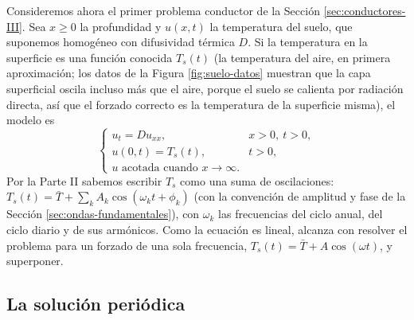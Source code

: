 \documentclass[12pt, a4paper]{amsbook}
\theoremstyle{remark}
\theoremstyle{definition}
\numberwithin{section}{chapter}
\numberwithin{subsection}{section}
\numberwithin{equation}{section}
\numberwithin{figure}{chapter}
\begin{document}
Consideremos ahora el primer problema conductor de la Sección \ref{sec:conductores-III}. Sea $x\ge 0$ la profundidad y $u(x,t)$ la temperatura del suelo, que suponemos homogéneo con difusividad térmica $D$. Si la temperatura en la superficie es una función conocida $T_s(t)$ (la temperatura del aire, en primera aproximación; los datos de la Figura \ref{fig:suelo-datos} muestran que la capa superficial oscila incluso más que el aire, porque el suelo se calienta por radiación directa, así que el forzado correcto es la temperatura de la superficie misma), el modelo es
\begin{equation}\label{eq:suelo}
\begin{cases}
u_t = D u_{xx}, & x>0,\ t>0,\\
u(0,t) = T_s(t), & t>0,\\
u \text{ acotada cuando } x\to\infty .
\end{cases}
\end{equation}
Por la Parte II sabemos escribir $T_s$ como una suma de oscilaciones: $T_s(t) = \bar T + \sum_k A_k\cos(\omega_k t + \phi_k)$ (con la convención de amplitud y fase de la Sección \ref{sec:ondas-fundamentales}), con $\omega_k$ las frecuencias del ciclo anual, del ciclo diario y de sus armónicos. Como la ecuación es lineal, alcanza con resolver el problema para un forzado de una sola frecuencia, $T_s(t) = \bar T + A\cos(\omega t)$, y superponer.

\subsection*{La solución periódica}
\end{document}
